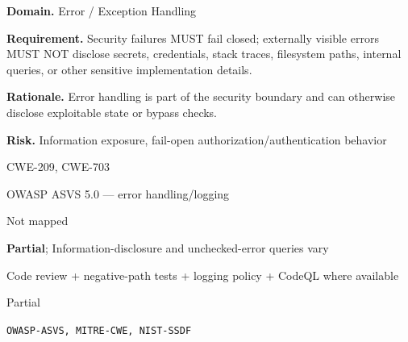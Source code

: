 \documentclass[10pt,letterpaper]{article}
\newcommand{\prioritybadge}[2]{\tcbox[on line,boxrule=0pt,arc=1.2mm,boxsep=0.7mm,left=1mm,right=1mm,top=0.4mm,bottom=0.4mm,colback=#2!12,coltext=#2]{\scriptsize\bfseries #1}}
\begin{document}
\begin{rulebox}[title={\texttt{SCS-ALL-ERROR-001} \hfill \prioritybadge{High Priority}{High}}]
\textbf{Domain.} Error / Exception Handling

\textbf{Requirement.} Security failures MUST fail closed; externally visible errors MUST NOT disclose secrets, credentials, stack traces, filesystem paths, internal queries, or other sensitive implementation details.

\textbf{Rationale.} Error handling is part of the security boundary and can otherwise disclose exploitable state or bypass checks.

\textbf{Risk.} Information exposure, fail-open authorization/authentication behavior

\begin{description}[leftmargin=2.65cm,labelwidth=2.3cm,style=nextline,itemsep=1pt,topsep=3pt]
  \item[CWE] CWE-209, CWE-703
  \item[OWASP] OWASP ASVS 5.0 --- error handling/logging
  \item[CERT] Not mapped
  \item[CodeQL] \textbf{Partial}; Information-disclosure and unchecked-error queries vary
  \item[Enforcement] Code review + negative-path tests + logging policy + CodeQL where available
  \item[Automation] Partial
  \item[Sources] \texttt{OWASP-ASVS, MITRE-CWE, NIST-SSDF}
\end{description}
\end{rulebox}
\end{document}
